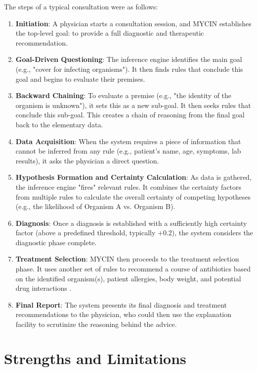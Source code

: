 \documentclass[conference]{IEEEtran}
\begin{document}
The steps of a typical consultation were as follows:
\begin{enumerate}
    \item \textbf{Initiation}: A physician starts a consultation session, and MYCIN establishes the top-level goal: to provide a full diagnostic and therapeutic recommendation.
    \item \textbf{Goal-Driven Questioning}: The inference engine identifies the main goal (e.g., "cover for infecting organisms"). It then finds rules that conclude this goal and begins to evaluate their premises.
    \item \textbf{Backward Chaining}: To evaluate a premise (e.g., "the identity of the organism is unknown"), it sets this as a new sub-goal. It then seeks rules that conclude this sub-goal. This creates a chain of reasoning from the final goal back to the elementary data.
    \item \textbf{Data Acquisition}: When the system requires a piece of information that cannot be inferred from any rule (e.g., patient's name, age, symptoms, lab results), it asks the physician a direct question.
    \item \textbf{Hypothesis Formation and Certainty Calculation}: As data is gathered, the inference engine "fires" relevant rules. It combines the certainty factors from multiple rules to calculate the overall certainty of competing hypotheses (e.g., the likelihood of Organism A vs. Organism B).
    \item \textbf{Diagnosis}: Once a diagnosis is established with a sufficiently high certainty factor (above a predefined threshold, typically +0.2), the system considers the diagnostic phase complete.
    \item \textbf{Treatment Selection}: MYCIN then proceeds to the treatment selection phase. It uses another set of rules to recommend a course of antibiotics based on the identified organism(s), patient allergies, body weight, and potential drug interactions \cite{b10}.
    \item \textbf{Final Report}: The system presents its final diagnosis and treatment recommendations to the physician, who could then use the explanation facility to scrutinize the reasoning behind the advice.
\end{enumerate}

\section{Strengths and Limitations}
\end{document}
